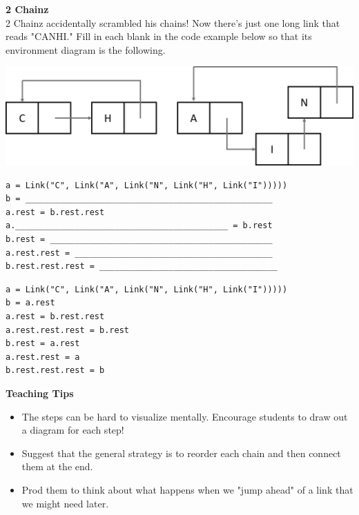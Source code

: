 \begin{blocksection}
\question
\textbf{2 Chainz}\\
2 Chainz accidentally scrambled his chains! Now there's just one long link that reads "CANHI." Fill in each blank in the code example below so that its environment diagram is the following.

\includegraphics[width=.45\textwidth]{2chainz.png}

\begin{lstlisting}
a = Link("C", Link("A", Link("N", Link("H", Link("I")))))
b = __________________________________________________
a.rest = b.rest.rest
a.___________________________________________ = b.rest
b.rest = _____________________________________________
a.rest.rest = ________________________________________
b.rest.rest.rest = ____________________________________
\end{lstlisting}


\begin{solution}[2in]
\begin{lstlisting}
a = Link("C", Link("A", Link("N", Link("H", Link("I")))))
b = a.rest
a.rest = b.rest.rest
a.rest.rest.rest = b.rest
b.rest = a.rest
a.rest.rest = a
b.rest.rest.rest = b

\end{lstlisting}
\end{solution}
\end{blocksection}

\begin{blocksection}
\begin{guide}
\textbf{Teaching Tips}
\begin{itemize}
	\item The steps can be hard to visualize mentally. Encourage students to draw out a diagram for each step!
	\item Suggest that the general strategy is to reorder each chain and then connect them at the end.
	\item Prod them to think about what happens when we "jump ahead" of a link that we might need later.
\end{itemize}
\end{guide}
\end{blocksection}
